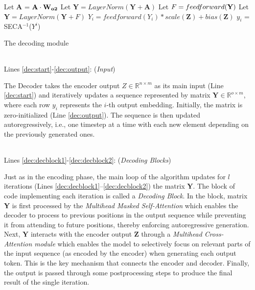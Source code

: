 \documentclass[algorithms,article,submit,pdftex,moreauthors]{Definitions/mdpi}
\begin{document}
\begin{algorithm2e}
{{                Let {\bf A} = ${\bf A \cdot W_{o2}}$\;
                \label{dec:outproject2}
                Let $\textbf{Y} = LayerNorm(\textbf{Y} + \textbf{A})$\;
                \label{dec:norm2}
                Let $F = feedforward({\bf Y})$\;
                \label{dec:ffn}
                Let $\textbf{Y} = LayerNorm(\textbf{Y} + F)$\;
                \label{dec:norm3}
            } \label{dec:decblock2}
            $Y_i = feedforward(Y_i)  * scale(\textbf{Z}) + bias(\textbf{Z})$\; \label{dec:finalproj}
            $y_i$ = SECA$^{-1}$($Y^i$) \;
        } \label{dec:outer2}                     
    	\caption{The decoding module} 
    \label{algo:decoding}
\end{algorithm2e}

~\\Lines \ref{dec:start}-\ref{dec:output}: (\textit{Input})

The Decoder takes the encoder output $Z \in \mathbb{R}^{n \times m}$ as its main input (Line \ref{dec:start}) and iteratively updates a sequence represented by matrix $\textbf{Y} \in \mathbb{R}^{o \times m}$, where each row $y_i$ represents the $i$-th output embedding. Initially, the matrix is zero-initialized (Line \ref{dec:output}). The sequence is then updated autoregressively, i.e., one timestep at a time with each new element depending on the previously generated ones.

~\\Lines \ref{dec:decblock1}-\ref{dec:decblock2}: (\textit{Decoding Blocks})

Just as in the encoding phase, the main loop of the algorithm updates for $l$ iterations (Lines \ref{dec:decblock1}–\ref{dec:decblock2}) the matrix $\textbf{Y}$. The block of code implementing each iteration is called a \textit{Decoding Block}.
In the block, matrix {\bf Y} is first processed by the {\em Multihead Masked Self-Attention} which enables the decoder to process to previous positions in the output sequence while preventing it from attending to future positions, thereby enforcing autoregressive generation.
Next, $\mathbf{Y}$ interacts with the encoder output $\mathbf{Z}$ through a {\em Multihead Cross-Attention module} which enables the model to selectively focus on relevant parts of the input sequence (as encoded by the encoder) when generating each output token. This is the key mechanism that connects the encoder and decoder.
Finally, the output is passed through some postprocessing steps to produce the final result of the single iteration.
\end{document}
